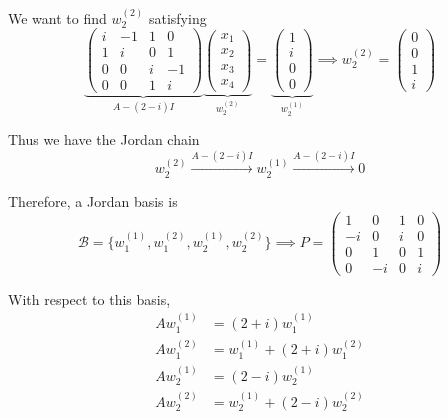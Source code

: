 \begin{example}
\begin{enumerate}
				We want to find $w_2^{(2)}$ satisfying
				\begin{equation}
					\underbrace{\begin{pmatrix}
						i & -1 & 1 & 0 \\
						1 & i & 0 & 1 \\
						0 & 0 & i & -1 \\
						0 & 0 & 1 & i
					\end{pmatrix}}_{A - (2-i)I}
					\underbrace{\begin{pmatrix}
						x_1 \\
						x_2 \\
						x_3 \\
						x_4
					\end{pmatrix}}_{w_2^{(2)}}
					=
					\underbrace{\begin{pmatrix}
						1 \\
						i \\
						0 \\
						0
					\end{pmatrix}}_{w_2^{(1)}}
					\implies
					w_2^{(2)}
					=
					\begin{pmatrix}
						0 \\
						0 \\
						1 \\
						i
					\end{pmatrix}
				\end{equation}

				Thus we have the Jordan chain
				\begin{equation}
					w_2^{(2)}
					\xrightarrow{A - (2-i)I}
					w_2^{(1)}
					\xrightarrow{A - (2-i)I}
					0
				\end{equation}
		\end{enumerate}

		Therefore, a Jordan basis is
		\begin{equation}
			\mathcal{B}
			=
			\big\{
				w_1^{(1)}, w_1^{(2)},
				w_2^{(1)}, w_2^{(2)}
			\big\}
			\implies
			P =
			\begin{pmatrix}
				1 & 0 & 1 & 0 \\
				-i & 0 & i & 0 \\
				0 & 1 & 0 & 1 \\
				0 & -i & 0 & i
			\end{pmatrix}
		\end{equation}

		With respect to this basis,
		\begin{align}
			Aw_1^{(1)} &= (2+i)w_1^{(1)} \\
			Aw_1^{(2)} &= w_1^{(1)} + (2+i)w_1^{(2)} \\
			Aw_2^{(1)} &= (2-i)w_2^{(1)} \\
			Aw_2^{(2)} &= w_2^{(1)} + (2-i)w_2^{(2)}
		\end{align}


\end{example}
